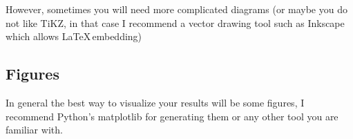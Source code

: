 \documentclass{project-logbook}
\begin{document}
		\begin{HighlightedNote}{}
			However, sometimes you will need more complicated diagrams (or maybe you do not like TiKZ, in that case I recommend a vector drawing tool such as Inkscape which allows \LaTeX \,embedding)
		\end{HighlightedNote}

		\subsection{Figures} \label{sub:figures}

		\begin{HighlightedNote}{}
			In general the best way to visualize your results will be some figures, I recommend Python's matplotlib for generating them or any other tool you are familiar with.
		\end{HighlightedNote}



\end{document}

